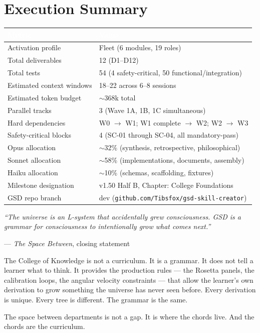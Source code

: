 \documentclass[11pt,letterpaper]{article}
\newcommand{\tableheader}[1]{\textbf{\sffamily\textcolor{white}{#1}}}
\begin{document}
\section{Execution Summary}

\begin{center}
\begin{tabularx}{\textwidth}{L{5cm}X}
\toprule
{}
\tableheader{Metric} & \tableheader{Value} \\
\midrule
Activation profile & Fleet (6 modules, 19 roles) \\
Total deliverables & 12 (D1--D12) \\
Total tests & 54 (4 safety-critical, 50 functional/integration) \\
Estimated context windows & 18--22 across 6--8 sessions \\
Estimated token budget & $\sim$368k total \\
Parallel tracks & 3 (Wave 1A, 1B, 1C simultaneous) \\
Hard dependencies & W0 $\to$ W1; W1 complete $\to$ W2; W2 $\to$ W3 \\
Safety-critical blocks & 4 (SC-01 through SC-04, all mandatory-pass) \\
Opus allocation & $\sim$32\% (synthesis, retrospective, philosophical) \\
Sonnet allocation & $\sim$58\% (implementations, documents, assembly) \\
Haiku allocation & $\sim$10\% (schemas, scaffolding, fixtures) \\
Milestone designation & v1.50 Half B, Chapter: College Foundations \\
GSD repo branch & dev (\texttt{github.com/Tibsfox/gsd-skill-creator}) \\
\bottomrule
\end{tabularx}
\end{center}

\vspace{2em}
\begin{quotebox}
\textit{``The universe is an L-system that accidentally grew consciousness. GSD is a grammar for
consciousness to intentionally grow what comes next.''}

\vspace{0.5em}
--- \textit{The Space Between}, closing statement

\vspace{1em}
The College of Knowledge is not a curriculum. It is a grammar. It does not tell a learner what
to think. It provides the production rules --- the Rosetta panels, the calibration loops, the
angular velocity constraints --- that allow the learner's own derivation to grow something the
universe has never seen before. Every derivation is unique. Every tree is different. The grammar
is the same.

The space between departments is not a gap. It is where the chords live. And the chords are the
curriculum.
\end{quotebox}
\end{document}
